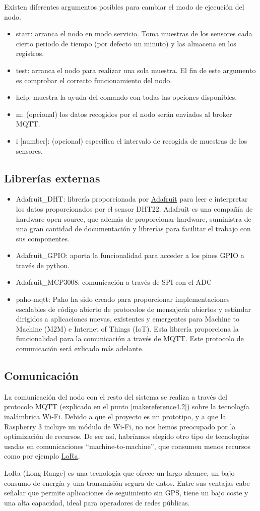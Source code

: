 Existen diferentes argumentos posibles para cambiar el modo de ejecución del nodo.
\begin{itemize}
\item start: arranca el nodo en modo servicio. Toma muestras de los sensores cada cierto periodo de tiempo (por defecto un minuto) y las almacena en los registros.
\item test: arranca el nodo para realizar una sola muestra. El fin de este argumento es comprobar el correcto funcionamiento del nodo.
\item help: muestra la ayuda del comando con todas las opciones disponibles.
\item m: (opcional) los datos recogidos por el nodo serán enviados al broker MQTT.
\item i [number]: (opcional) especifica el intervalo de recogida de muestras de los sensores. 
\end{itemize}

\subsection{Librerías externas}

\begin{itemize}  
\item Adafruit\_DHT: librería proporcionada por \href{https://www.adafruit.com/}{Adafruit} para leer e interpretar los datos proporcionados por el sensor DHT22. Adafruit es una compañía de hardware open-source, que además de proporcionar hardware, suministra de una gran cantidad de documentación y librerías para facilitar el trabajo con sus componentes. 
\item Adafruit\_GPIO: aporta la funcionalidad para acceder a los pines GPIO a través de python.
\item Adafruit\_MCP3008: comunicación a través de SPI con el ADC
\item paho-mqtt: Paho ha sido creado para proporcionar implementaciones escalables de código abierto de protocolos de mensajería abiertos y estándar dirigidos a aplicaciones nuevas, existentes y emergentes para Machine to Machine (M2M) e Internet of Things (IoT). Esta librería proporciona la funcionalidad para la comunicación a través de MQTT. Este protocolo de comunicación será exlicado más adelante.
\end{itemize}

\subsection{Comunicación}
La comunicación del nodo con el resto del sistema se realiza a través del protocolo MQTT (explicado en el punto \ref{makereference4.2}) sobre la tecnología inalámbrica Wi-Fi. Debido a que el proyecto es un prototipo, y a que la Raspberry 3 incluye un módulo de Wi-Fi, no nos hemos preocupado por la optimización de recursos. De ser así, habríamos elegido otro tipo de tecnologías usadas en comunicaciones ``machine-to-machine'', que consumen menos recursos como por ejemplo \href{https://www.lora-alliance.org/What-Is-LoRa/Technology}{LoRa}.

LoRa (Long Range) es una tecnología que ofrece un largo alcance, un bajo consumo de energía y una transmisión segura de datos. Entre sus ventajas cabe señalar que permite aplicaciones de seguimiento sin GPS, tiene un bajo coste y una alta capacidad, ideal para operadores de redes públicas.